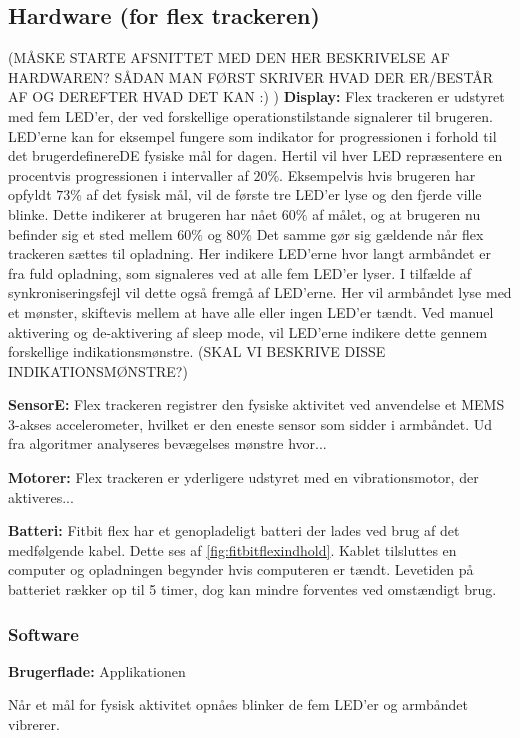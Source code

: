 \subsection{Hardware (for flex trackeren)}
(MÅSKE STARTE AFSNITTET MED DEN HER BESKRIVELSE AF HARDWAREN? SÅDAN MAN FØRST SKRIVER HVAD DER ER/BESTÅR AF OG DEREFTER HVAD DET KAN :) )
\textbf{Display:} 
Flex trackeren er udstyret med fem LED'er, der ved forskellige operationstilstande signalerer til brugeren. 
LED'erne kan for eksempel fungere som indikator for progressionen i forhold til det brugerdefinereDE fysiske mål for dagen. Hertil vil hver LED repræsentere en procentvis progressionen i intervaller af $20 \%$. Eksempelvis hvis brugeren har opfyldt $73 \%$ af det fysisk mål, vil de første tre LED'er lyse og den fjerde ville blinke. Dette indikerer at brugeren har nået $60 \%$ af målet, og at brugeren nu befinder sig et sted mellem $60 \%$ og $80 \%$ 
Det samme gør sig gældende når flex trackeren sættes til opladning. Her indikere LED'erne hvor langt armbåndet er fra fuld opladning, som signaleres ved at alle fem LED'er lyser. 
I tilfælde af synkroniseringsfejl vil dette også fremgå af LED'erne. Her vil armbåndet lyse med et mønster, skiftevis mellem at have alle eller ingen LED'er tændt. 
Ved manuel aktivering og de-aktivering af sleep mode, vil LED'erne indikere dette gennem forskellige indikationsmønstre. (SKAL VI BESKRIVE DISSE INDIKATIONSMØNSTRE?)

\textbf{SensorE:} 
Flex trackeren registrer den fysiske aktivitet ved anvendelse et MEMS 3-akses accelerometer, hvilket er den eneste sensor som sidder i armbåndet. Ud fra algoritmer analyseres bevægelses mønstre hvor...


\textbf{Motorer:}
Flex trackeren er yderligere udstyret med en vibrationsmotor, der aktiveres... 


\textbf{Batteri:} 
Fitbit flex har et genopladeligt batteri der lades ved brug af det medfølgende kabel. Dette ses af \autoref{fig:fitbitflexindhold}. Kablet tilsluttes en computer og opladningen begynder hvis computeren er tændt. 
Levetiden på batteriet rækker op til 5 timer, dog kan mindre forventes ved omstændigt brug. 


\subsubsection{Software}
\textbf{Brugerflade:} %
Applikationen  

Når et mål for fysisk aktivitet opnåes blinker de fem LED'er og armbåndet vibrerer. 

